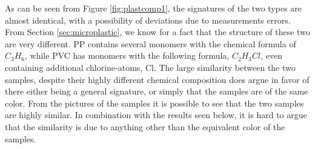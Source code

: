 \noindent
As can be seen from Figure \ref{fig:plastcomp1}, the signatures of the two types are almost identical, with a possibility of deviations due to measurements errors. From Section \ref{sec:microplastic}, we know for a fact that the structure of these two are very different. PP contains several monomers with the chemical formula of $C_3H_6$, while PVC has monomers with the following formula, $C_2H_3Cl$, even containing additional chlorine-atoms, Cl.  The large similarity between the two samples, despite their highly different chemical composition does argue in favor of there either being a general signature, or simply that the samples are of the same color. From the pictures of the samples it is possible to see that the two samples are highly similar. In combination with the results seen below, it is hard to argue that the similarity is due to anything other than the equivalent color of the samples. 
\\\\
